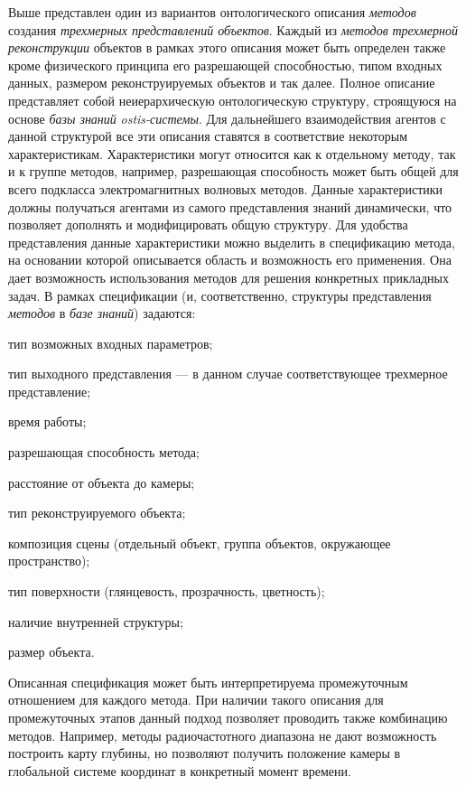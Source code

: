 Выше представлен один из вариантов онтологического описания \textit{методов} создания \textit{трехмерных представлений объектов}. Каждый из \textit{методов} \textit{трехмерной реконструкции} объектов в рамках этого описания может быть определен также кроме физического принципа его разрешающей способностью, типом входных данных, размером реконструируемых объектов и так далее. Полное описание представляет собой неиерархическую онтологическую структуру, строящуюся на основе \textit{базы знаний} \textit{ostis-системы}. Для дальнейшего взаимодействия агентов с данной структурой все эти описания ставятся в соответствие некоторым характеристикам. Характеристики могут относится как к отдельному методу, так и к группе методов, например, разрешающая способность может быть общей для всего подкласса электромагнитных волновых методов. Данные характеристики должны получаться агентами из самого представления знаний динамически, что позволяет дополнять и модифицировать общую структуру.
Для удобства представления данные характеристики можно выделить в спецификацию метода, на основании которой описывается область и возможность его применения. Она дает возможность использования методов для решения конкретных прикладных задач. В рамках спецификации (и, соответственно, структуры представления \textit{методов} в \textit{базе знаний}) задаются:
\begin{textitemize}
    \item тип возможных входных параметров;
    \item тип выходного представления --- в данном случае соответствующее трехмерное представление;
    \item время работы;
    \item разрешающая способность метода;
    \item расстояние от объекта до камеры;
    \item тип реконструируемого объекта;
    \item композиция сцены (отдельный объект, группа объектов, окружающее пространство);
    \item тип поверхности (глянцевость, прозрачность, цветность);
    \item наличие внутренней структуры;
    \item размер объекта.
\end{textitemize}

Описанная спецификация может быть интерпретируема промежуточным отношением для каждого метода. При наличии такого описания для промежуточных этапов данный подход позволяет проводить также комбинацию методов. Например, методы радиочастотного диапазона не дают возможность построить карту глубины, но позволяют получить положение камеры в глобальной системе координат в конкретный момент времени.

